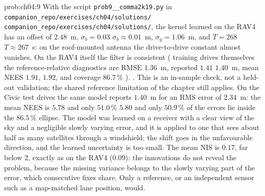 \documentclass[graybox,envcountchap]{style/SNmono}
\newcommand{\repopath}[1]{\texttt{#1}}
\providecommand{\DIFadd}[1]{{\protect\color{blue} #1}} %
\providecommand{\DIFdel}[1]{{\protect\color{red} #1}} %
\providecommand{\DIFaddbegin}{} %
\providecommand{\DIFaddend}{} %
\providecommand{\DIFdelbegin}{} %
\providecommand{\DIFdelend}{} %
\begin{document}
\begin{sol}{prob:ch04:9}
With the script \repopath{prob9\_\_\allowbreak comma2k19.py} in \DIFdelbegin \DIFdel{\repopath{companion\_\allowbreak repo/\allowbreak exercises/\allowbreak ch04/\allowbreak solutions/}}\DIFdelend \DIFaddbegin \DIFadd{\repopath{companion\_\allowbreak repo/\allowbreak exercises/\allowbreak ch04/\allowbreak solutions/\allowbreak }}\DIFaddend , the kernel learned on the RAV4 has an offset of $2.48$~m, \DIFdelbegin \DIFdel{$\sigma_b=0.03$}\DIFdelend \DIFaddbegin \DIFadd{$\sigma_b\approx0.01$}\DIFaddend ~m, $\sigma_g=1.06$~m, and \DIFdelbegin \DIFdel{$T=268$}\DIFdelend \DIFaddbegin \DIFadd{$T\approx267$}\DIFaddend ~s: on the roof-mounted antenna the drive-to-drive constant almost vanishes. On the RAV4 \DIFdelbegin \DIFdel{itself the filter is consistent (}\DIFdelend \DIFaddbegin \DIFadd{training drives themselves the reference-relative diagnostics are }\DIFaddend RMSE $1.36$~m, reported \DIFdelbegin \DIFdel{$1.41$}\DIFdelend \DIFaddbegin \DIFadd{$1.40$}\DIFaddend ~m, mean NEES \DIFdelbegin \DIFdel{$1.91$, }\DIFdelend \DIFaddbegin \DIFadd{$1.92$, and }\DIFaddend coverage $86.7\,\%$\DIFdelbegin \DIFdel{). }\DIFdelend \DIFaddbegin \DIFadd{. This is an in-sample check, not a held-out validation; the shared reference limitation of the chapter still applies. }\DIFaddend On the Civic test drives the same model reports $1.40$~m for an RMS error of $2.34$~m: the mean NEES is \DIFdelbegin \DIFdel{$5.78$ and only $51.0\,\%$ }\DIFdelend \DIFaddbegin \DIFadd{$5.80$ and only $50.9\,\%$ }\DIFaddend of the errors lie inside the $86.5\,\%$ ellipse. The model was learned on a receiver with a clear view of the sky and a negligible slowly varying error, and it is applied to one that sees about half as many satellites through a windshield: the shift goes in the unfavourable direction, and the learned uncertainty is too small. The mean NIS is $0.17$, far below $2$, exactly as on the RAV4 ($0.09$): the innovations do not reveal the problem, because the missing variance belongs to the slowly varying part of the error, which consecutive fixes share. Only a reference, or an independent sensor such as a map-matched lane position, would.
\end{sol}
\end{document}
